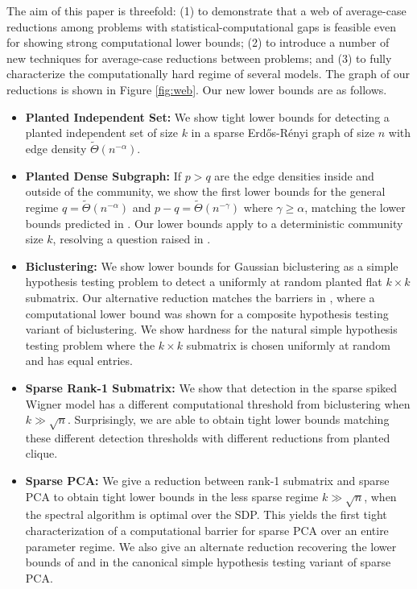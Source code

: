 The aim of this paper is threefold: (1) to demonstrate that a web of average-case reductions among problems with statistical-computational gaps is feasible even for showing strong computational lower bounds; (2) to introduce a number of new techniques for average-case reductions between problems; and (3) to fully characterize the computationally hard regime of several models. The graph of our reductions is shown in Figure \ref{fig:web}. Our new lower bounds are as follows.
\begin{itemize}
\item \textbf{Planted Independent Set:} We show tight lower bounds for detecting a planted independent set of size $k$ in a sparse Erd\H{o}s-R\'{e}nyi graph of size $n$ with edge density $\tilde{\Theta}(n^{-\alpha})$.
\item \textbf{Planted Dense Subgraph:} If $p > q$ are the edge densities inside and outside of the community, we show the first lower bounds for the general regime $q = \tilde{\Theta}(n^{-\alpha})$ and $p - q = \tilde{\Theta}(n^{-\gamma})$ where $\gamma \ge \alpha$, matching the lower bounds predicted in \cite{chen2016statistical}. Our lower bounds apply to a deterministic community size $k$, resolving a question raised in \cite{hajek2015computational}.
\item \textbf{Biclustering:} We show lower bounds for Gaussian biclustering as a simple hypothesis testing problem to detect a uniformly at random planted flat $k \times k$ submatrix. Our alternative reduction matches the barriers in \cite{ma2015computational}, where a computational lower bound was shown for a composite hypothesis testing variant of biclustering. We show hardness for the natural simple hypothesis testing problem where the $k \times k$ submatrix is chosen uniformly at random and has equal entries.
\item \textbf{Sparse Rank-1 Submatrix:} We show that detection in the sparse spiked Wigner model has a different computational threshold from biclustering when $k \gg \sqrt{n}$. Surprisingly, we are able to obtain tight lower bounds matching these different detection thresholds with different reductions from planted clique.
\item \textbf{Sparse PCA:} We give a reduction between rank-1 submatrix and sparse PCA to obtain tight lower bounds in the less sparse regime $k \gg \sqrt{n}$, when the spectral algorithm is optimal over the SDP. This yields the first tight characterization of a computational barrier for sparse PCA over an entire parameter regime. We also give an alternate reduction recovering the lower bounds of \cite{berthet2013complexity} and \cite{gao2017sparse} in the canonical simple hypothesis testing variant of sparse PCA.

\end{itemize}
